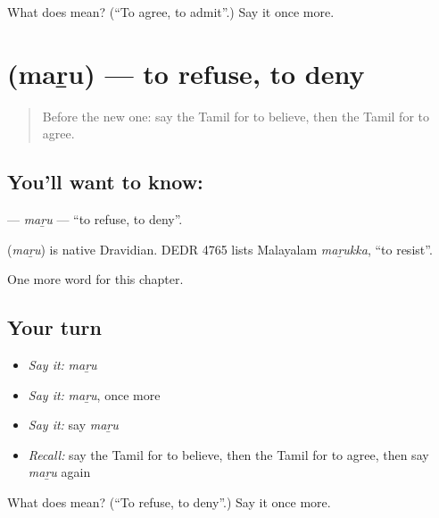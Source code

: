 \begin{tcolorbox}[breakable,colback=teal!4,colframe=teal!35!black,title={Before you move on}]
What does  mean? (\textquotedblleft{}To agree, to admit\textquotedblright{}.) Say it once more.
\end{tcolorbox}
\section[\texorpdfstring{\ta{மறு} (maṟu)}{மறு (maṟu)}]{ (maṟu) — to refuse, to deny}

\label{lesson:TA-C199-maru}



\begin{quote}
Before the new one: say the Tamil for to believe, then the Tamil for to agree.
\end{quote}

\subsection*{You'll want to know: }
\textbf{} — \emph{maṟu} — \textquotedblleft{}to refuse, to deny\textquotedblright{}.

\begin{cousinweb}
\textbf{} (\emph{maṟu}) is native Dravidian. DEDR 4765 lists Malayalam \emph{maṟukka}, \textquotedblleft{}to resist\textquotedblright{}.
\end{cousinweb}

\begin{grammarlens}[title={What you've built}]
One more word for this chapter.
\end{grammarlens}

\subsection*{Your turn}
\begin{itemize}
\raggedright
  \item \emph{Say it:} \emph{maṟu}
  \item \emph{Say it:} \emph{maṟu}, once more
  \item \emph{Say it:} say \emph{maṟu}
  \item \emph{Recall:} say the Tamil for to believe, then the Tamil for to agree, then say \emph{maṟu} again
\end{itemize}

\begin{tcolorbox}[breakable,colback=teal!4,colframe=teal!35!black,title={Before you move on}]
What does  mean? (\textquotedblleft{}To refuse, to deny\textquotedblright{}.) Say it once more.
\end{tcolorbox}
